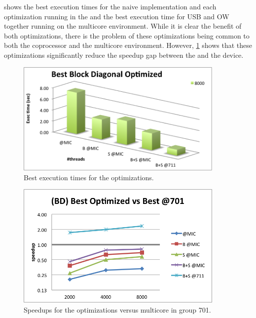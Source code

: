 \documentclass[../thesis]{subfiles}
\begin{document}
	 shows the best execution times for the naive implementation and each optimization running in the \intel\xeonphi and the best execution time for USB and OW together running on the multicore environment. While it is clear the benefit of both optimizations, there is the problem of these optimizations being common to both the coprocessor and the multicore environment. However, \cref{fig:mic:optims:best:times} shows that these optimizations significantly reduce the speedup gap between the \cpu and the device.

	\begin{figure}[p]
		\begin{center}
			\includegraphics[width=0.9\textwidth]{assets/images/mic/optims/best.png}
		\end{center}
		\caption{Best execution times for the optimizations.}
		\label{fig:mic:optims:best:times}
	\end{figure}

	\begin{figure}[p]
		\begin{center}
			\includegraphics[width=0.9\textwidth]{assets/images/mic/optims/best-speedup.png}
		\end{center}
		\caption{Speedups for the optimizations versus multicore in group 701.}
		\label{fig:mic:optims:best:speedup}
	\end{figure}
\end{document}
